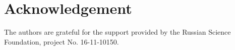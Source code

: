 \documentclass[10pt,twocolumn,a4paper]{article}
\begin{document}
\section*{Acknowledgement}
The authors are grateful for the support provided by the Russian Science Foundation, project No. 16-11-10150.

{}

\end{document}
